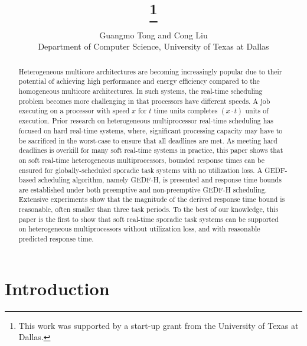 \documentclass[Times, 10pt,twocolumn]{article}
\theoremstyle{definition}
\begin{document}
  

\title{\protect\vspace{-.5in}{Supporting Soft Real-Time Sporadic Task Systems on Heterogeneous Multiprocessors with No Utilization Loss}\thanks{This work was supported by a start-up
grant from the University of Texas at Dallas.}}
\author{Guangmo Tong and Cong Liu\\
Department of Computer Science, University of Texas at Dallas}

\maketitle
\thispagestyle{empty}



\begin{abstract}

Heterogeneous multicore architectures are becoming increasingly popular due to their potential of achieving high performance and energy efficiency compared to the homogeneous multicore architectures. In such systems, the real-time scheduling problem becomes more challenging in that processors have different speeds. A job executing on a processor with speed $x$ for $t$ time units completes $(x \cdot t)$ units of execution. Prior research on heterogeneous multiprocessor real-time scheduling has focused on hard real-time systems, where, significant processing capacity may have to be sacrificed in the worst-case to ensure that all deadlines are met. As meeting hard deadlines is overkill for many soft real-time systems in practice, this paper shows that on soft real-time heterogeneous multiprocessors, bounded response times can be ensured for globally-scheduled sporadic task systems with no utilization loss. A GEDF-based scheduling algorithm, namely GEDF-H, is presented and response time bounds are established under both preemptive and non-preemptive GEDF-H scheduling. Extensive experiments show that  the magnitude of the derived response time bound is reasonable, often smaller than three task periods. To the best of our knowledge, this paper is the first to show that soft real-time sporadic task systems can be supported on heterogeneous multiprocessors without utilization loss, and with reasonable predicted response time.

\end{abstract}

\section{Introduction}
\label{sec:intro}
\end{document}
